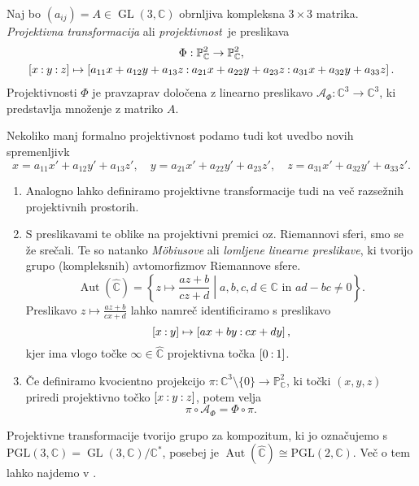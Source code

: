 \documentclass[mat1]{fmfdelo}
\numberwithin{equation}{section}
\newcommand{\C}{\mathbb C}
\newcommand{\CM}{\mathbb C ^*}
\newcommand{\PC}{\mathbb{P}^2_\C}
\newcommand{\RS}{\widehat{\C}}
\newcommand{\pcoor}[1]{%
\begingroup\lccode`~=`: \lowercase{\endgroup
\edef~}{\mathbin{\mathchar\the\mathcode`:}\nobreak}%
\left[%
\begingroup
\mathcode`:=\string"8000
#1%
\endgroup
\right]%
}
\newcommand{\kom}[1]{
    \underline{//#1}
}
\DeclareMathOperator{\GL}{GL}
\DeclareMathOperator{\Aut}{Aut}
\theoremstyle{definition}
\begin{document}
\begin{definicija}
    Naj bo $(a_{ij}) = A \in \GL(3, \C)$ obrnljiva kompleksna $3 \times 3$ matrika. \emph{Projektivna transformacija} ali \emph{projektivnost} je preslikava
        \begin{gather*}
            \Phi : \PC \to \PC,\\
            \pcoor{x:y:z} \mapsto \pcoor{a_{11}x + a_{12}y + a_{13}z: a_{21}x + a_{22}y + a_{23}z: a_{31}x + a_{32}y + a_{33}z}.
        \end{gather*}
    Projektivnosti $\Phi$ je pravzaprav določena z linearno preslikavo $\mathcal{A}_{\Phi} : \C^3 \to \C^3$, ki predstavlja množenje z matriko $A$.

    Nekoliko manj formalno projektivnost podamo tudi kot uvedbo novih spremenljivk 
    \[
        x = a_{11}x' + a_{12}y' + a_{13}z', \quad y = a_{21}x' + a_{22}y' + a_{23}z', \quad z = a_{31}x' + a_{32}y' + a_{33}z'.  
    \]
\end{definicija}

\begin{opomba}
    \begin{enumerate}
        \item Analogno lahko definiramo projektivne transformacije tudi na več razsežnih projektivnih prostorih. 
        \item
        S preslikavami te oblike na projektivni premici oz. Riemannovi sferi, smo se že srečali. Te so natanko \emph{Möbiusove} ali \emph{lomljene linearne preslikave}, ki tvorijo grupo (kompleksnih) avtomorfizmov Riemannove sfere.
        $$\Aut(\RS) = \left\{ z \mapsto \frac{az + b}{cz +d} \middle\vert a,b,c,d \in \C \text{ in }  ad - bc \neq 0 \right\}.$$
        Preslikavo $z \mapsto \tfrac{az + b}{cx +d}$ lahko namreč identificiramo s preslikavo 
        \[
            \pcoor{x:y} \mapsto \pcoor{ax + by: cx + dy},  
        \]
        kjer ima vlogo točke $\infty \in \RS$ projektivna točka $\pcoor{0:1}$. 
        \item
        Če definiramo kvocientno projekcijo $\pi : \C^3 \setminus \{0\} \to \PC$, ki točki $(x,y,z)$ priredi projektivno točko $\pcoor{x:y:z}$, potem velja 
        $$\pi \circ \mathcal{A}_\Phi = \Phi \circ \pi.$$
    \end{enumerate}
\end{opomba}

Projektivne transformacije tvorijo grupo za kompozitum, ki jo označujemo s $\operatorname{PGL(3, \C)} = \GL(3,\C)/\CM$, posebej je $\Aut(\RS) \cong \operatorname{PGL(2,\C)}$. Več o tem lahko najdemo v \cite[poglavje 11]{Gibson}.
\end{document}
